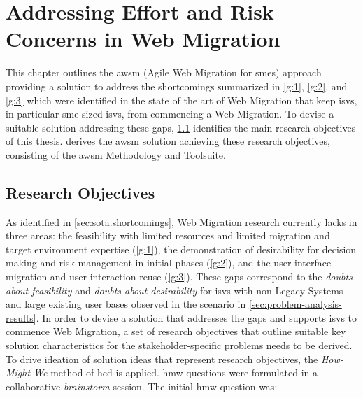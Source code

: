 \hypertarget{sec:solution}{%
\chapter{Addressing Effort and Risk Concerns in Web Migration}\label{sec:solution}}
This chapter outlines the \gls{awsm} (Agile Web Migration for \glspl{sme}) \autocite{Heil2016AWSM} approach providing a solution to address the shortcomings summarized in \cref{g:1}, \cref{g:2}, and \cref{g:3} which were identified in the state of the art of \gls{Web Migration} that keep \glspl{isv}, in particular \gls{sme}-sized \glspl{isv}, from commencing a \gls{Web Migration}.
To devise a suitable solution addressing these gaps, \cref{sec:research-objectives} identifies the main research objectives of this thesis.
 derives the  \gls{awsm} solution achieving these research objectives, consisting of the \gls{awsm} Methodology and Toolsuite.

\vspace{-15pt}
\hypertarget{sec:research-objectives}{%
\section{Research Objectives}\label{sec:research-objectives}}
\vspace{15pt}

As identified in \cref{sec:sota.shortcomings}, \gls{Web Migration} research currently lacks in three areas: the feasibility with limited resources and limited migration and \gls{target environment} expertise (\cref{g:1}), the demonstration of desirability for decision making and risk management in initial phases (\cref{g:2}), and the user interface migration and user interaction reuse (\cref{g:3}).
These gaps correspond to the \emph{doubts about feasibility} and \emph{doubts about desirability} for \glspl{isv} with non-\glspl{Legacy System} and large existing user bases observed in the scenario in \cref{sec:problem-analysis-results}.
In order to devise a solution that addresses the gaps and supports \glspl{isv} to commence \gls{Web Migration}, a set of research objectives that outline suitable key solution characteristics for the stakeholder-specific problems needs to be derived.
To drive ideation of solution ideas that represent research objectives, the \emph{How-Might-We} method of \gls{hcd} is applied.
\gls{hmw} questions were formulated in a collaborative \emph{brainstorm} session.
The initial \gls{hmw} question was:

